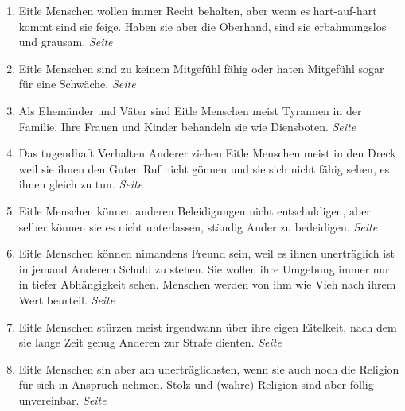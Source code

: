 \begin{enumerate}
\begin{enumerate}
 \item Eitle Menschen wollen immer Recht behalten, aber wenn es hart-auf-hart
kommt sind sie feige. Haben sie aber die Oberhand, sind sie erbahmungslos und
grausam.
 \dotfill \textit{Seite \pageref{ref:12_02_eitle_menschen_streit}}\\

 \item Eitle Menschen sind zu keinem Mitgefühl fähig oder haten Mitgefühl sogar
für eine Schwäche.
 \dotfill \textit{Seite \pageref{ref:12_02_eitle_menschen_mitgefuehl}}\\
 
 \item Als Ehemänder und Väter sind Eitle Menschen meist Tyrannen in der
Familie. Ihre Frauen und Kinder behandeln sie wie Diensboten.
 \dotfill \textit{Seite \pageref{ref:12_03_eitle_menschen_ehe}}\\
 
 \item Das tugendhaft Verhalten Anderer ziehen Eitle Menschen meist in den Dreck
weil sie ihnen den Guten Ruf nicht gönnen und sie sich nicht fähig sehen, es
ihnen gleich zu tun.
 \dotfill \textit{Seite \pageref{ref:12_04_eitle_menschen_tugent}}\\
 
 \item Eitle Menschen können anderen Beleidigungen nicht entschuldigen, aber
selber können sie es nicht unterlassen, ständig Ander zu bedeidigen.
 \dotfill \textit{Seite \pageref{ref:12_04_eitle_menschen_beleidigung}}\\
 
 \item Eitle Menschen können nimandens Freund sein, weil es ihnen unerträglich
ist in jemand Anderem Schuld zu stehen. Sie wollen ihre Umgebung immer nur in
tiefer Abhängigkeit sehen. Menschen werden von ihm wie Vieh nach ihrem Wert
beurteil.
 \dotfill \textit{Seite \pageref{ref:12_05_eitle_menschen_freundschaft}}\\
 
 \item Eitle Menschen stürzen meist irgendwann über ihre eigen Eitelkeit, nach
dem sie lange Zeit genug Anderen zur Strafe dienten. 
 \dotfill \textit{Seite \pageref{ref:12_06_eitle_menschen_sturz}}\\
 
 \item Eitle Menschen sin aber am unerträglichsten, wenn sie auch noch die
Religion für sich in Anspruch nehmen. Stolz und (wahre) Religion sind aber
föllig unvereinbar.
 \dotfill \textit{Seite \pageref{ref:12_07_eitle_menschen_religion}}\\
 

\end{enumerate}
\end{enumerate}
